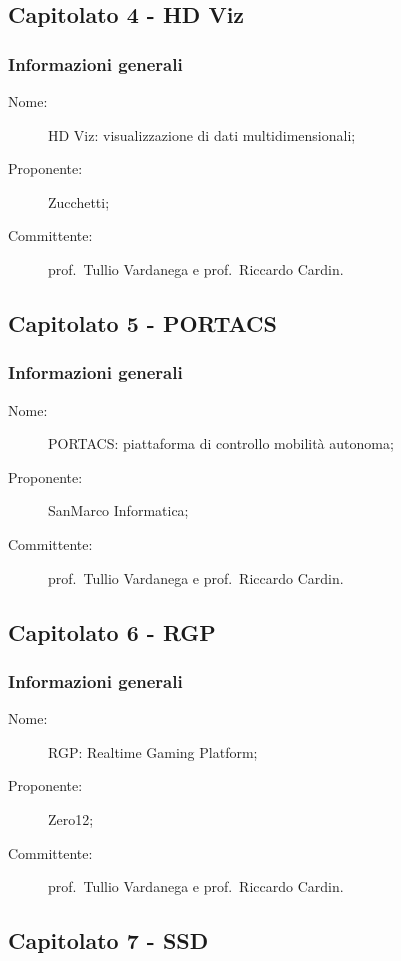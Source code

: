 \subsection{Capitolato 4 - HD Viz}
\subsubsection{Informazioni generali}
\begin{description}
	\item[Nome:] HD Viz: visualizzazione di dati multidimensionali;
	\item[Proponente:] Zucchetti;
	\item[Committente:] prof.~Tullio Vardanega e prof.~Riccardo Cardin.
\end{description}

\subsection{Capitolato 5 - PORTACS}
\subsubsection{Informazioni generali}
\begin{description}
	\item[Nome:] PORTACS: piattaforma di controllo mobilità autonoma;
	\item[Proponente:] SanMarco Informatica;
	\item[Committente:] prof.~Tullio Vardanega e prof.~Riccardo Cardin.
\end{description}

\subsection{Capitolato 6 - RGP}
\subsubsection{Informazioni generali}
\begin{description}
	\item[Nome:] RGP: Realtime Gaming Platform;
	\item[Proponente:] Zero12;
	\item[Committente:] prof.~Tullio Vardanega e prof.~Riccardo Cardin.
\end{description}

\subsection{Capitolato 7 - SSD}
